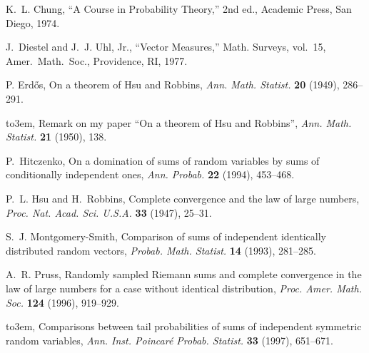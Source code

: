 \documentclass[12pt]{amsart}
\theoremstyle{definition}
\theoremstyle{plain}
\theoremstyle{remark}
\begin{document}
\providecommand{\bysame}{\leavevmode\hbox to3em{\hrulefill}\thinspace}
\begin{thebibliography}{1}

K.~L. Chung, ``A Course in Probability Theory,'' 2nd ed., Academic Press,
  San Diego, 1974.

J.~Diestel and J.~J. {Uhl, Jr.}, ``Vector Measures,'' Math. Surveys,
  vol.~15, Amer.\ Math.\ Soc., Providence, RI, 1977.

P. Erd\H{o}s, {On a theorem of {H}su and {R}obbins}, \emph{Ann.
Math. Statist.}
  \textbf{20} (1949), 286--291.

\bysame, {Remark on my paper ``{O}n a theorem of {H}su and {R}obbins''},
  \emph{Ann. Math. Statist.} \textbf{21} (1950), 138.

P.~Hitczenko, {On a domination of sums of random variables by sums of
  conditionally independent ones}, \emph{Ann. Probab.} \textbf{22} (1994), 453--468.

P.~L. Hsu and H.~Robbins, {Complete convergence and the law of large
  numbers}, \emph{Proc. Nat. Acad. Sci. U.S.A.} \textbf{33} (1947), 25--31.

S.~J. Montgomery-Smith, {Comparison of sums of independent identically
  distributed random vectors}, \emph{Probab. Math. Statist.} \textbf{14} (1993),
  281--285.

A.~R. Pruss, {Randomly sampled {R}iemann sums and complete
  convergence in the law of large numbers for a case without identical
  distribution}, \emph{Proc. Amer. Math. Soc.} \textbf{124} (1996), 919--929.

\bysame, {Comparisons between tail probabilities of sums of independent
  symmetric random variables}, \emph{Ann. Inst. Poincar\'e Probab.
  Statist.}
  \textbf{33} (1997), 651--671.

\end{thebibliography}
\end{document}
